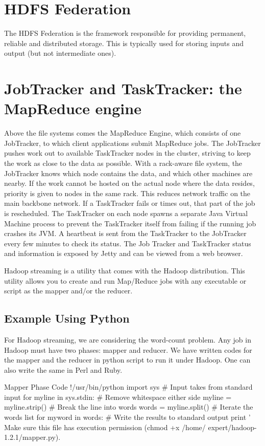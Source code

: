 \section{HDFS Federation}
The HDFS Federation is the framework responsible for providing permanent, 
reliable and distributed storage. This is typically used for storing inputs and output
 (but not intermediate ones).

\section{JobTracker and TaskTracker: the MapReduce engine}

Above the file systems comes the MapReduce Engine, which consists of one JobTracker, to which client applications submit MapReduce jobs. The JobTracker pushes work out to available TaskTracker nodes in the cluster, striving to keep the work as close to the data as possible. With a rack-aware file system, the JobTracker knows which node contains the data, and which other machines are nearby. If the work cannot be hosted on the actual node where the data resides, priority is given to nodes in the same rack. This reduces network traffic on the main backbone network. If a TaskTracker fails or times out, that part of the job is rescheduled. The TaskTracker on each node spawns a separate Java Virtual Machine process to prevent the TaskTracker itself from failing if the running job crashes its JVM. A heartbeat is sent from the TaskTracker to the JobTracker every few minutes to check its status. The Job Tracker and TaskTracker status and information is exposed by Jetty and can be viewed from a web browser.

Hadoop streaming is a utility that comes with the Hadoop distribution. This utility allows you to create and run Map/Reduce jobs with any executable or script as the mapper and/or the reducer.

\subsection{Example Using Python}
For Hadoop streaming, we are considering the word-count problem. Any job in Hadoop must have two phases: mapper and reducer. We have written codes for the mapper and the reducer in python script to run it under Hadoop. One can also write the same in Perl and Ruby.

Mapper Phase Code
!/usr/bin/python
import sys
# Input takes from standard input for myline in sys.stdin: 
# Remove whitespace either side myline = myline.strip() 
# Break the line into words words = myline.split() 
# Iterate the words list for myword in words: 
# Write the results to standard output print '%
Make sure this file has execution permission (chmod +x /home/ expert/hadoop-1.2.1/mapper.py).

